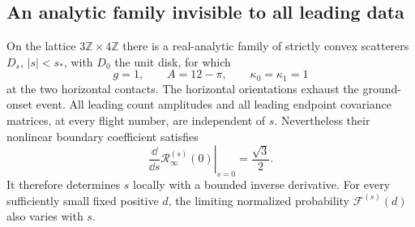 \subsection{An analytic family invisible to all leading data}
\begin{theorem}
\label{thm:v4-jet-fiber}
On the lattice $3\mathbb Z\times4\mathbb Z$ there is a real-analytic
family of strictly convex scatterers $D_s$, $|s|<s_*$, with $D_0$ the
unit disk, for which
\[
 g=1,\qquad A=12-\pi,\qquad \kappa_0=\kappa_1=1
\]
at the two horizontal contacts. The horizontal orientations exhaust
the ground-onset event. All leading count amplitudes and all leading
endpoint covariance matrices, at every flight number, are independent
of $s$. Nevertheless their nonlinear boundary coefficient satisfies
\begin{equation}\label{eq:v4-detected-jet}
 \left.\frac{\dd}{\dd s}\mathcal R_\infty^{(s)}(0)\right|_{s=0}
                                  =\frac{\sqrt3}{2}.
\end{equation}
It therefore determines $s$ locally with a bounded inverse derivative.
For every sufficiently small fixed positive $d$, the limiting
normalized probability $\mathcal F^{(s)}(d)$ also varies with $s$.
\end{theorem}
